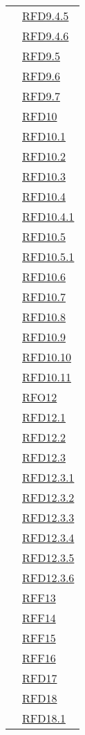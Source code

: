 \begin{longtable}{|>{\centering}m{5cm}|m{5cm}<{\centering}|}
& \hyperlink{RFD9.4.5}{RFD9.4.5}\\
& \hyperlink{RFD9.4.6}{RFD9.4.6}\\
& \hyperlink{RFD9.5}{RFD9.5}\\
& \hyperlink{RFD9.6}{RFD9.6}\\
& \hyperlink{RFD9.7}{RFD9.7}\\
& \hyperlink{RFD10}{RFD10}\\
& \hyperlink{RFD10.1}{RFD10.1}\\
& \hyperlink{RFD10.2}{RFD10.2}\\
& \hyperlink{RFD10.3}{RFD10.3}\\
& \hyperlink{RFD10.4}{RFD10.4}\\
& \hyperlink{RFD10.4.1}{RFD10.4.1}\\
& \hyperlink{RFD10.5}{RFD10.5}\\
& \hyperlink{RFD10.5.1}{RFD10.5.1}\\
& \hyperlink{RFD10.6}{RFD10.6}\\
& \hyperlink{RFD10.7}{RFD10.7}\\
& \hyperlink{RFD10.8}{RFD10.8}\\
& \hyperlink{RFD10.9}{RFD10.9}\\
& \hyperlink{RFD10.10}{RFD10.10}\\
& \hyperlink{RFD10.11}{RFD10.11}\\
& \hyperlink{RFO12}{RFO12}\\
& \hyperlink{RFD12.1}{RFD12.1}\\
& \hyperlink{RFD12.2}{RFD12.2}\\
& \hyperlink{RFD12.3}{RFD12.3}\\
& \hyperlink{RFD12.3.1}{RFD12.3.1}\\
& \hyperlink{RFD12.3.2}{RFD12.3.2}\\
& \hyperlink{RFD12.3.3}{RFD12.3.3}\\
& \hyperlink{RFD12.3.4}{RFD12.3.4}\\
& \hyperlink{RFD12.3.5}{RFD12.3.5}\\
& \hyperlink{RFD12.3.6}{RFD12.3.6}\\
& \hyperlink{RFF13}{RFF13}\\
& \hyperlink{RFF14}{RFF14}\\
& \hyperlink{RFF15}{RFF15}\\
& \hyperlink{RFF16}{RFF16}\\
& \hyperlink{RFD17}{RFD17}\\
& \hyperlink{RFD18}{RFD18}\\
& \hyperlink{RFD18.1}{RFD18.1}\\

\end{longtable}
